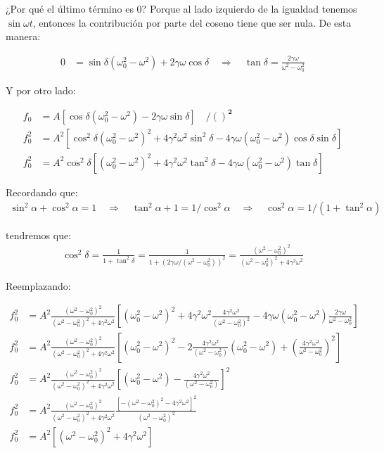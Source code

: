 \documentclass[letterpaper,11pt]{article}
\begin{document}
\noindent ¿Por qué el último término es 0? Porque al lado izquierdo de la igualdad tenemos $\sin{\omega t}$, entonces la contribución por parte del coseno tiene que ser nula. De esta manera:

\begin{align*}
    0 &= \sin\delta(\omega_0^2-\omega^2)+2\gamma\omega\cos\delta \quad \Rightarrow\quad \tan\delta=\frac{2\gamma\omega}{\omega^2-\omega_0^2}
\end{align*}

\noindent Y por otro lado:

\begin{align*}
    f_0 &= A\left[\cos\delta(\omega_0^2-\omega^2)-2\gamma\omega \sin\delta\right] \quad \boldsymbol{/ ()^2}\\
    f_0^2 &= A^2\left[\cos^2\delta(\omega_0^2-\omega^2)^2+4\gamma^2\omega^2 \sin^2\delta-4\gamma\omega(\omega_0^2-\omega^2)\cos\delta\sin\delta\right]\\
    f_0^2 &= A^2 \cos^2\delta\left[(\omega_0^2-\omega^2)^2+4\gamma^2\omega^2\tan^2\delta-4\gamma\omega(\omega_0^2-\omega^2)\tan\delta\right]
\end{align*}

\noindent Recordando que:
\begin{align*}
    \sin^2\alpha+\cos^2\alpha=1 \quad\Rightarrow\quad \tan^2\alpha+1=1/\cos^2\alpha \quad \Rightarrow\quad \cos^2\alpha=1/(1+\tan^2\alpha)
\end{align*}

\noindent tendremos que:
\begin{align*}
    \cos^2\delta = \frac{1}{1+\tan^2\delta} = \frac{1}{1+(2\gamma\omega/(\omega^2-\omega_0^2))^2}=\frac{(\omega^2-\omega_0^2)^2}{(\omega^2-\omega_0^2)^2+4\gamma^2\omega^2}
\end{align*}

\noindent Reemplazando:

\begin{align*}
    f_0^2 &= A^2\frac{(\omega^2-\omega_0^2)^2}{(\omega^2-\omega_0^2)^2+4\gamma^2\omega^2}\left[(\omega_0^2-\omega^2)^2+4\gamma^2\omega^2\frac{4\gamma^2\omega^2}{(\omega^2-\omega_0^2)^2}-4\gamma\omega(\omega^2_0-\omega^2)\frac{2\gamma\omega}{\omega^2-\omega_0^2}\right]\\
    f_0^2 &= A^2\frac{(\omega^2-\omega_0^2)^2}{(\omega^2-\omega_0^2)^2+4\gamma^2\omega^2} \left[(\omega_0^2-\omega^2)^2- 2\frac{4\gamma^2\omega^2 }{(\omega^2-\omega_0^2)}(\omega_0^2-\omega^2)+\left(\frac{4\gamma^2\omega^2}{\omega^2-\omega_0^2}\right)^2\right]\\
    f_0^2 &= A^2\frac{(\omega^2-\omega_0^2)^2}{(\omega^2-\omega_0^2)^2+4\gamma^2\omega^2}\left[(\omega_0^2-\omega^2)-\frac{4\gamma^2\omega^2}{(\omega^2-\omega_0^2)}\right]^2\\
    f_0^2 &= A^2 \frac{(\omega^2-\omega_0^2)^2}{(\omega^2-\omega_0^2)^2+4\gamma^2\omega^2}\frac{\left[-(\omega^2-\omega_0^2)^2-4\gamma^2\omega^2\right]^2}{(\omega^2-\omega_0^2)^2}\\
    f_0^2 &= A^2 \left[(\omega^2-\omega_0^2)^2+4\gamma^2\omega^2\right]
\end{align*}
\end{document}
